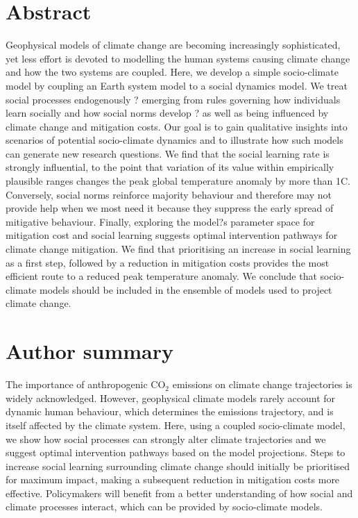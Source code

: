 \documentclass[10pt,letterpaper]{article}
\begin{document}
\section*{Abstract}
Geophysical models of climate change are becoming increasingly sophisticated, yet less effort is devoted to modelling the human systems causing climate change and how the two systems are coupled. Here, we develop a simple socio-climate model by coupling an Earth system model to a social dynamics model. We treat social processes endogenously ? emerging from rules governing how individuals learn socially and how social norms develop ? as well as being influenced by climate change and mitigation costs. Our goal is to gain qualitative insights into scenarios of potential socio-climate dynamics and to illustrate how such models can generate new research questions. We find that the social learning rate is strongly influential, to the point that variation of its value within empirically plausible ranges changes the peak global temperature anomaly by more than 1\degree C. Conversely, social norms reinforce majority behaviour and therefore may not provide help when we most need it because they suppress the early spread of mitigative behaviour. Finally, exploring the model?s parameter space for mitigation cost and social learning suggests optimal intervention pathways for climate change mitigation. We find that prioritising an increase in social learning as a first step, followed by a reduction in mitigation costs provides the most efficient route to a reduced peak temperature anomaly. We conclude that socio-climate models should be included in the ensemble of models used to project climate change.


\section*{Author summary}
The importance of anthropogenic $\text{CO}_2$ emissions on climate change trajectories is widely acknowledged. However, geophysical climate models rarely account for dynamic human behaviour, which determines the emissions trajectory, and is itself affected by the climate system. Here, using a coupled socio-climate model, we show how social processes can strongly alter climate trajectories and we suggest optimal intervention pathways based on the model projections. Steps to increase social learning surrounding climate change should initially be prioritised for maximum impact, making a subsequent reduction in mitigation costs more effective. Policymakers will benefit from a better understanding of how social and climate processes interact, which can be provided by socio-climate models.
\end{document}
